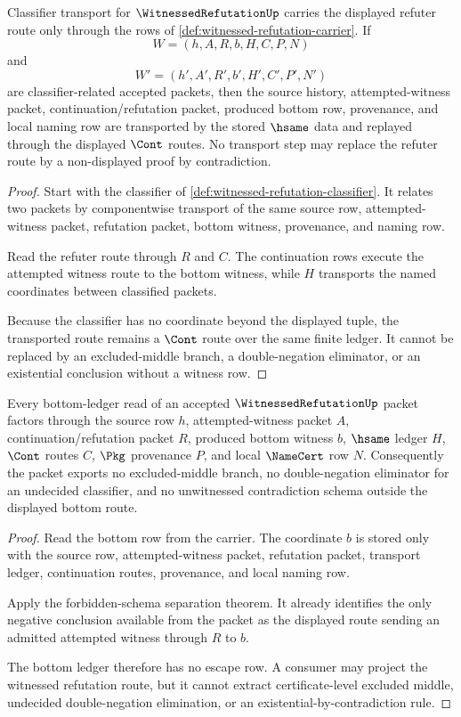 \begin{theorem}
\label{thm:witnessed-refutation-refuter-route-transport-obligation}
Classifier transport for $\WitnessedRefutationUp$ carries the displayed refuter route only through the rows of \autoref{def:witnessed-refutation-carrier}. If
$$
W=(h,A,R,b,H,C,P,N)
$$
and
$$
W'=(h',A',R',b',H',C',P',N')
$$
are classifier-related accepted packets, then the source history, attempted-witness packet, continuation/refutation packet, produced bottom row, provenance, and local naming row are transported by the stored $\hsame$ data and replayed through the displayed $\Cont$ routes. No transport step may replace the refuter route by a non-displayed proof by contradiction.
\end{theorem}
\begin{proof}
Start with the classifier of \autoref{def:witnessed-refutation-classifier}. It relates two packets by componentwise transport of the same source row, attempted-witness packet, refutation packet, bottom witness, provenance, and naming row.

Read the refuter route through $R$ and $C$. The continuation rows execute the attempted witness route to the bottom witness, while $H$ transports the named coordinates between classified packets.

Because the classifier has no coordinate beyond the displayed tuple, the transported route remains a $\Cont$ route over the same finite ledger. It cannot be replaced by an excluded-middle branch, a double-negation eliminator, or an existential conclusion without a witness row.
\end{proof}

\begin{theorem}
\label{thm:witnessed-refutation-bottom-ledger-nonescape-obligation}
Every bottom-ledger read of an accepted $\WitnessedRefutationUp$ packet factors through the source row $h$, attempted-witness packet $A$, continuation/refutation packet $R$, produced bottom witness $b$, $\hsame$ ledger $H$, $\Cont$ routes $C$, $\Pkg$ provenance $P$, and local $\NameCert$ row $N$. Consequently the packet exports no excluded-middle branch, no double-negation eliminator for an undecided classifier, and no unwitnessed contradiction schema outside the displayed bottom route.
\end{theorem}
\begin{proof}
Read the bottom row from the carrier. The coordinate $b$ is stored only with the source row, attempted-witness packet, refutation packet, transport ledger, continuation routes, provenance, and local naming row.

Apply the forbidden-schema separation theorem. It already identifies the only negative conclusion available from the packet as the displayed route sending an admitted attempted witness through $R$ to $b$.

The bottom ledger therefore has no escape row. A consumer may project the witnessed refutation route, but it cannot extract certificate-level excluded middle, undecided double-negation elimination, or an existential-by-contradiction rule.
\end{proof}


